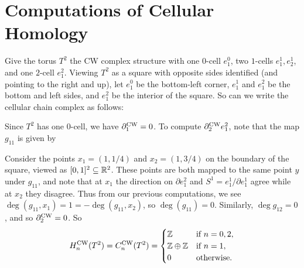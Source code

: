 \section{Computations of Cellular Homology}
\begin{example}
  Give the torus $T^2$ the CW complex structure
  with one $0$-cell $e_1^0$, two
  $1$-cells $e_1^1, e_2^1$, and one $2$-cell $e_1^2$.
  Viewing $T^2$ as a square with opposite sides
  identified (and pointing to the right and up),
  let $e_1^0$ be the bottom-left corner,
  $e_1^1$ and $e_1^2$ be the bottom and left sides,
  and $e_1^2$ be the interior of the square.
  So can we write the cellular chain complex as follows:
  \begin{center}
  \end{center}
  Since $T^2$ has one $0$-cell, we have
  $\partial_1^{\mathrm{CW}} = 0$. To compute $\partial_2^{\mathrm{CW}} e_1^2$,
  note that the map $g_{11}$ is given by
  \begin{center}
  \end{center}
  Consider the points $x_1 = (1, 1 / 4)$ and
  $x_2 = (1, 3 / 4)$ on the boundary of the square,
  viewed as $[0, 1]^2 \subseteq \mathbb{R}^2$. These
  points are both mapped to the same point $y$ under
  $g_{11}$, and note that at $x_1$ the direction
  on $\partial e_1^2$ and $S^1 = e_1^1 / \partial e_1^1$
  agree while at $x_2$ they disagree.
  Thus from our previous computations, we
  see $\deg(g_{11}, x_1) = 1 = -\deg(g_{11}, x_2)$,
  so
  $\deg(g_{11}) = 0$.
  Similarly, $\deg g_{12} = 0$, and so
  $\partial_2^{\mathrm{CW}} = 0$. So
  \[
    H_n^{\mathrm{CW}}(T^2) = C_n^{\mathrm{CW}}(T^2) =
    \begin{cases}
      \mathbb{Z} & \text{if } n = 0, 2, \\
      \mathbb{Z} \oplus \mathbb{Z} & \text{if } n = 1, \\
      0 & \text{otherwise}.
    \end{cases}
  \]
\end{example}

